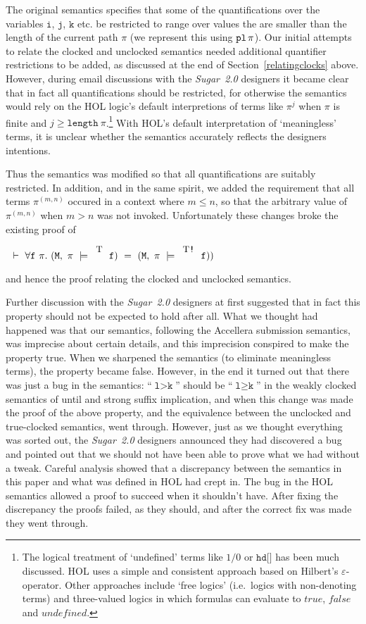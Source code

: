 \documentclass{llncs}
\newcommand{\T}{\texttt{\small\rm{T}}}
\newcommand{\sSem}[4]{(\tt{#1,~#2~\models^{\hspace*{-2.3mm}\raisebox{1mm}{\tt#3}}~#4})}
\newcommand{\fSem}[4]{(\tt{#1,~#2~\models^{\hspace*{-2.3mm}\raisebox{1mm}{\tt#3}}~#4})}
\newcommand{\pl}{\texttt{pl}\xspace}
\newcommand{\pathSeg}[2]{#1^{#2}}
\newcommand\Sugar{{\it{Sugar~2.0}}\xspace}
\renewcommand{\t}[1]{\texttt{#1}}
\begin{document}
The original semantics specifies
that some of the quantifications over the variables
$\t{i}$, $\t{j}$, $\t{k}$ etc.{} be restricted to range over values
the are smaller than the length of the current path $\pi$
(we represent this using $\pl\hspace*{0.5mm}\pi$).
Our initial attempts to relate the clocked and unclocked semantics needed
additional quantifier restrictions to be added, as discussed at the end of
Section~\ref{relatingclocks} above. However, during email discussions with the
\Sugar designers it became clear that in fact all quantifications
should be restricted, for otherwise the semantics would rely on the
HOL logic's default interpretions of terms like $\pi^j$ when $\pi$ is
finite and $j \geq \t{length}~\pi$.\footnote{The logical treatment of
`undefined' terms like $1/0$ or $\t{hd[]}$ has been much
discussed. HOL uses a simple and consistent approach based on
Hilbert's $\varepsilon$-operator. Other approaches include `free
logics' (i.e.~logics with non-denoting terms) and three-valued logics
in which formulas can evaluate to $true$, $false$ and $undefined$.}
With HOL's default interpretation of `meaningless' terms, it is
unclear whether the semantics accurately reflects the designers
intentions.

Thus the semantics was modified so that all quantifications are
suitably restricted.  In addition, and in the same spirit, we added
the requirement that all terms $\pathSeg{\pi}{(m,n)}$ occured in a
context where $m\leq n$, so that the arbitrary value of
$\pathSeg{\pi}{(m,n)}$ when $m>n$ was not invoked. Unfortunately
these changes broke the
existing proof of

\medskip

$~~\vdash~\forall{\t{f}}~\pi.~\fSem{M}{\pi}{\T}{f}~=~\sSem{M}{\pi}{\T\texttt{!}}{f})$

\medskip

and hence the proof relating the clocked and unclocked semantics.

Further discussion with the \Sugar designers at first suggested that
in fact this property should not be expected to hold after all.  What
we thought had happened was that our semantics, following the
Accellera submission semantics, was imprecise about certain details,
and this imprecision conspired to make the property true.  When we
sharpened the semantics (to eliminate meaningless terms), the property
became false. However, in the end it turned out that there was just a
bug in the semantics: ``$\t{l}>\t{k}$'' should be ``$\t{l}\geq\t{k}$''
in the weakly clocked semantics of until and strong suffix
implication, and when this change was made the proof of the above
property, and the equivalence between the unclocked and true-clocked
semantics, went through. However, just as we thought everything was
sorted out, the \Sugar designers announced they had discovered a bug
and pointed out that we should not have been able to prove what we had
without a tweak.  Careful analysis showed that a discrepancy between
the semantics in this paper and what was defined in HOL had crept
in. The bug in the HOL semantics allowed a proof to succeed when it
shouldn't have. After fixing the discrepancy the proofs failed, as
they should, and after the correct fix was made they went through.
\end{document}
